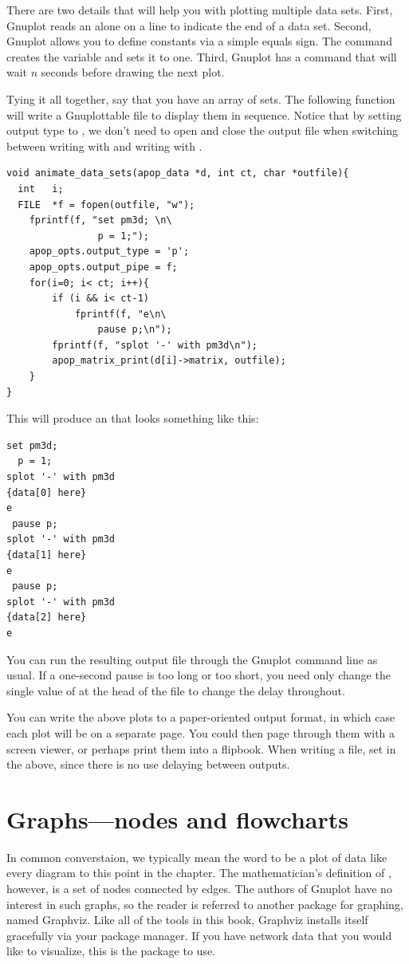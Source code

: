 There are two details that will help you with plotting multiple data
sets. First, Gnuplot reads an  alone on a line to indicate the end
of a data set. Second, Gnuplot allows you to define constants via a
simple equals sign. The command  creates the variable 
and sets it to one. Third, Gnuplot has a  command that will
wait $n$ seconds before drawing the next plot. 

Tying it all together, say that you have an array of  
sets. The following function will write a Gnuplottable file to display
them in sequence. Notice that by setting output type to , we don't
need to open and close the output file when switching between
writing with  and writing with
.
\begin{lstlisting}
void animate_data_sets(apop_data *d, int ct, char *outfile){
  int   i;
  FILE  *f = fopen(outfile, "w");
    fprintf(f, "set pm3d; \n\
                p = 1;");
    apop_opts.output_type = 'p';
    apop_opts.output_pipe = f;
    for(i=0; i< ct; i++){
        if (i && i< ct-1)
            fprintf(f, "e\n\
                pause p;\n");
        fprintf(f, "splot '-' with pm3d\n");
        apop_matrix_print(d[i]->matrix, outfile);
    }
}
\end{lstlisting}
This will produce an  that looks something like this:
\begin{lstlisting}
set pm3d;
  p = 1;
splot '-' with pm3d
{data[0] here}
e
 pause p;
splot '-' with pm3d
{data[1] here}
e
 pause p;
splot '-' with pm3d
{data[2] here}
e
\end{lstlisting}

You can run the resulting output file through the Gnuplot command line
as usual. If a one-second pause is too long or too short, you need only
change the single value of \ci{p} at the head of the file to change the
delay throughout.

You can write the above plots to a paper-oriented output format, in which
case each plot will be on a separate page. You could then page through
them with a screen viewer, or perhaps print them into a flipbook. When writing a
file, set \ci{p=0} in the above, since there is no use delaying between
outputs.


\section{\treesymbol Graphs---nodes and flowcharts} In common converstaion, we
typically mean the word  to be a plot of data like every
diagram to this point in the chapter. The mathematician's definition
of \airq{graph}, however, is a set of nodes connected by edges. The
authors of Gnuplot have no interest in such graphs, so the reader is
referred to another package for graphing, named Graphviz. Like
all of the tools in this book, Graphviz installs itself
gracefully via your package manager. If you have network data that you
would like to visualize, this is the package to use.

